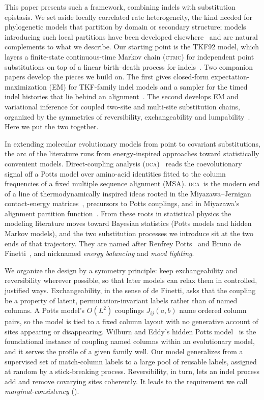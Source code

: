 \documentclass[11pt]{article}
\newcommand{\CTMC}{\textsc{ctmc}}
\newcommand{\DCA}{\textsc{dca}}
\begin{document}
This paper presents such a framework, combining indels with substitution
epistasis. We set aside locally correlated rate heterogeneity, the kind needed
for phylogenetic models that partition by domain or secondary structure;
models introducing such local partitions have been developed
elsewhere~\citep{Yang1995,ThorneGoldmanJones96,LargeHolmes2026} and are
natural complements to what we describe. Our starting point is the TKF92
model, which layers a finite-state continuous-time Markov chain (\CTMC) for
independent point substitutions on top of a linear birth--death process for
indels~\citep{ThorneEtAl91,ThorneEtAl92}. Two companion papers develop the
pieces we build on. The first gives closed-form expectation-maximization
(EM) for TKF-family indel models and a sampler for the timed indel histories
that lie behind an alignment~\citep{HolmesLarge2026BW}. The second develops
EM and variational inference for coupled two-site and multi-site
substitution chains, organized by the symmetries of reversibility,
exchangeability and lumpability~\citep{LargeHolmes2026Coupled}. Here we put
the two together.

In extending molecular evolutionary models from point to covariant
substitutions, the arc of the literature runs from energy-inspired approaches
toward statistically convenient models. Direct-coupling analysis
(\DCA)~\citep{Marks2011,Morcos2011,ekeberg2013} reads the coevolutionary
signal off a Potts model over amino-acid identities fitted to the column
frequencies of a fixed multiple sequence alignment (MSA). \DCA\ is the modern
end of a line of thermodynamically inspired ideas rooted in the
Miyazawa--Jernigan contact-energy
matrices~\citep{Miyazawa1985,Miyazawa1993}, precursors to Potts couplings,
and in Miyazawa's alignment partition function~\citep{Miyazawa1995}. From
these roots in statistical physics the modeling literature moves toward
Bayesian statistics (Potts models and hidden Markov models), and the two
substitution processes we introduce sit at the two ends of that trajectory.
They are named after Renfrey Potts~\citep{Potts1952} and Bruno de
Finetti~\citep{definetti1937}, and nicknamed \emph{energy balancing} and
\emph{mood lighting}.

We organize the design by a symmetry principle: keep exchangeability and
reversibility wherever possible, so that later models can relax them in
controlled, justified ways. Exchangeability, in the sense of de Finetti, asks
that the coupling be a property of latent, permutation-invariant labels
rather than of named columns. A Potts model's $O(L^2)$ couplings
$J_{ij}(a,b)$ name ordered column pairs, so the model is tied to a fixed
column layout with no generative account of sites appearing or disappearing.
Wilburn and Eddy's hidden Potts model~\citep{wilburneddy2020} is the
foundational instance of coupling named columns within an evolutionary
model, and it serves the profile of a given family well. Our model
generalizes from a supervised set of match-column labels to a large pool of
reusable labels, assigned at random by a stick-breaking process.
Reversibility, in turn, lets an indel process add and remove covarying sites
coherently. It leads to the requirement we call \emph{marginal-consistency}
().
\end{document}
